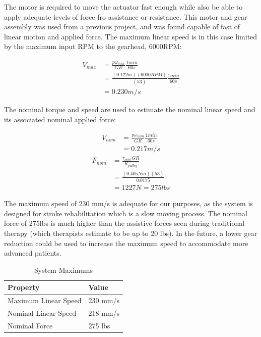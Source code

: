\documentclass[12pt]{report}
\begin{document}
	
	The motor is required to move the actuator fast enough while also be able to apply adequate levels of force fro assistance or resistance. This motor and gear assembly was used from a previous project, and was found capable of fast of linear motion and applied force. The maximum linear speed is in this case limited by the maximum input RPM to the gearhead, 6000RPM: 
	
	\begin{align*}
		V_{max} &= \frac{p\omega _{max}}{GR} \frac{1min}{60s} \\
		&= \frac{(0.122m)(6000 RPM)}{(53)} \frac{1min}{60s} \\
		&= 0.230 m/s
	\end{align*}
	
	The nominal torque and speed are used to estimate the nominal linear speed and its associated nominal applied force:
	
	\begin{align*}
		V_{nom} &= \frac{p\omega _{nom}}{GR} \frac{1min}{60s} \\
		&= 0.217 m/s
	\end{align*}
	\begin{align*}
		F_{nom} &= \frac{\tau _{nom}GR}{R_{pulley}} \\
		&= \frac{(0.405Nm)(53)}{0.0175} \\
		&= 1227N = 275 lbs
	\end{align*}

The maximum speed of 230 mm/s is adequate for our purposes, as the system is designed for stroke rehabilitation which is a slow moving process. The nominal force of 275lbs is much higher than the assistive forces seen during traditional therapy (which therapists estimate to be up to 20 lbs). In the future, a lower gear reduction could be used to increase the maximum speed to accommodate more advanced patients.

	\begin{table}[h]
	\centering
	\caption{System Maximums}	
	\begin{tabular}{|l|l|}
		\hline
		\textbf{Property} & \textbf{Value}  \\ \hline
 		Maximum Linear Speed & 230 mm/s \\ \hline
 		Nominal Linear Speed & 218 mm/s \\ \hline
 		Nominal Force & 275 lbs \\ \hline
		\end{tabular}
	\label{tab:gear}
	\end{table}		
		
\end{document}
